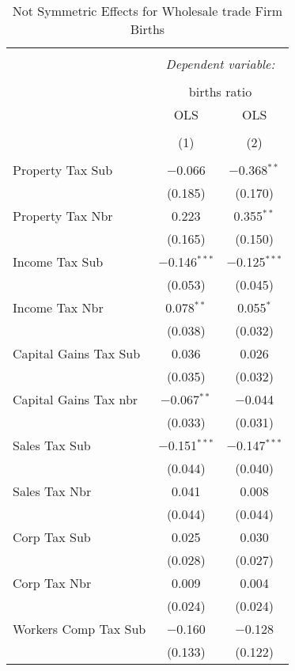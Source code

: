 
\begin{table}[!htbp] \centering 
  \caption{Not Symmetric Effects for  Wholesale trade Firm Births} 
  \label{} 
\begin{tabular}{@{\extracolsep{5pt}}lcc} 
\\[-1.8ex]\hline 
\hline \\[-1.8ex] 
 & \multicolumn{2}{c}{\textit{Dependent variable:}} \\ 
\cline{2-3} 
\\[-1.8ex] & \multicolumn{2}{c}{births ratio} \\ 
 & OLS & OLS \\ 
\\[-1.8ex] & (1) & (2)\\ 
\hline \\[-1.8ex] 
 Property Tax Sub & $-$0.066 & $-$0.368$^{**}$ \\ 
  & (0.185) & (0.170) \\ 
  Property Tax Nbr & 0.223 & 0.355$^{**}$ \\ 
  & (0.165) & (0.150) \\ 
  Income Tax Sub & $-$0.146$^{***}$ & $-$0.125$^{***}$ \\ 
  & (0.053) & (0.045) \\ 
  Income Tax Nbr & 0.078$^{**}$ & 0.055$^{*}$ \\ 
  & (0.038) & (0.032) \\ 
  Capital Gains Tax Sub & 0.036 & 0.026 \\ 
  & (0.035) & (0.032) \\ 
  Capital Gains Tax nbr & $-$0.067$^{**}$ & $-$0.044 \\ 
  & (0.033) & (0.031) \\ 
  Sales Tax Sub & $-$0.151$^{***}$ & $-$0.147$^{***}$ \\ 
  & (0.044) & (0.040) \\ 
  Sales Tax Nbr & 0.041 & 0.008 \\ 
  & (0.044) & (0.044) \\ 
  Corp Tax Sub & 0.025 & 0.030 \\ 
  & (0.028) & (0.027) \\ 
  Corp Tax Nbr & 0.009 & 0.004 \\ 
  & (0.024) & (0.024) \\ 
  Workers Comp Tax Sub & $-$0.160 & $-$0.128 \\ 
  & (0.133) & (0.122) \\ 

\end{tabular}
\end{table}
